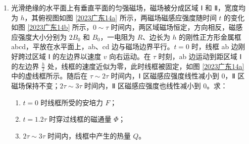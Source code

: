 \documentclass[\gkver]{gaokaozhenti}
\begin{document}
\begin{enumerate}
\item
光滑绝缘的水平面上有垂直平面的匀强磁场，磁场被分成区域 Ⅰ 和 Ⅱ，宽度均为 $h$，其俯视图如图 \ref{2023广东14a} 所示，两磁场磁感应强度随时间 $t$ 的变化如图 \ref{2023广东14b} 所示，$0 \sim \tau$ 时间内，两区域磁场恒定，方向相反，磁感应强度大小分别为 $2B_{0}$ 和 $B_{0}$，一电阻为 $R$、边长为 $h$ 的刚性正方形金属框 abcd，平放在水平面上，ab、cd 边与磁场边界平行。$t = 0$ 时，线框 ab 边刚好跨过区域 Ⅰ 的左边界以速度 $v$ 向右运动。在 $\tau$ 时刻，ab 边运动到距区域 Ⅰ 的左边界 $\frac{h}{2}$ 处，线框的速度近似为零，此时线框被固定，如图 \ref{2023广东14a} 中的虚线框所示。随后在 $\tau \sim 2\tau$ 时间内，Ⅰ 区磁感应强度线性减小到 0，Ⅱ 区磁场保持不变；$2\tau \sim 3\tau$ 时间内，Ⅱ 区磁感应强度也线性减小到 0。求：

\begin{enumerate}
	\item
	$t = 0$ 时线框所受的安培力 $F$；
	\item
	$t = 1.2\tau$ 时穿过线框的磁通量 $\Phi$；
	\item
	$2\tau \sim 3\tau$ 时间内，线框中产生的热量 $Q$。
\end{enumerate}


\end{enumerate}
\end{document}
